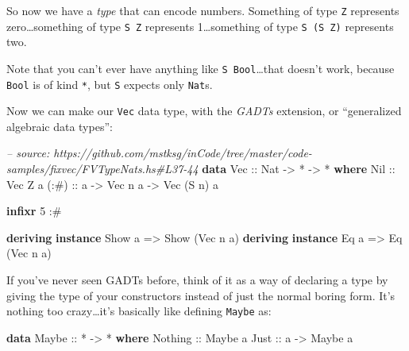 \documentclass[]{article}
\newenvironment{Shaded}{}{}
\newcommand{\KeywordTok}[1]{\textcolor[rgb]{0.00,0.44,0.13}{\textbf{{#1}}}}
\newcommand{\DataTypeTok}[1]{\textcolor[rgb]{0.56,0.13,0.00}{{#1}}}
\newcommand{\DecValTok}[1]{\textcolor[rgb]{0.25,0.63,0.44}{{#1}}}
\newcommand{\CommentTok}[1]{\textcolor[rgb]{0.38,0.63,0.69}{\textit{{#1}}}}
\newcommand{\OtherTok}[1]{\textcolor[rgb]{0.00,0.44,0.13}{{#1}}}
\newcommand{\FunctionTok}[1]{\textcolor[rgb]{0.02,0.16,0.49}{{#1}}}
\newcommand{\NormalTok}[1]{{#1}}
\begin{document}
So now we have a \emph{type} that can encode numbers. Something of type
\texttt{Z} represents zero\ldots{}something of type \texttt{S\ Z}
represents 1\ldots{}something of type \texttt{S\ (S\ Z)} represents two.

Note that you can't ever have anything like \texttt{S\ Bool}\ldots{}that
doesn't work, because \texttt{Bool} is of kind \texttt{*}, but
\texttt{S} expects only \texttt{Nat}s.

Now we can make our \texttt{Vec} data type, with the \emph{GADTs}
extension, or ``generalized algebraic data types'':

\begin{Shaded}
\begin{Highlighting}[]
\CommentTok{-- source: https://github.com/mstksg/inCode/tree/master/code-samples/fixvec/FVTypeNats.hs#L37-44}
\KeywordTok{data} \DataTypeTok{Vec}\OtherTok{ ::} \DataTypeTok{Nat} \OtherTok{->} \FunctionTok{*} \OtherTok{->} \FunctionTok{*} \KeywordTok{where}
    \DataTypeTok{Nil}\OtherTok{  ::} \DataTypeTok{Vec} \DataTypeTok{Z} \NormalTok{a}
\OtherTok{    (:#) ::} \NormalTok{a }\OtherTok{->} \DataTypeTok{Vec} \NormalTok{n a }\OtherTok{->} \DataTypeTok{Vec} \NormalTok{(}\DataTypeTok{S} \NormalTok{n) a}

\KeywordTok{infixr} \DecValTok{5} \FunctionTok{:#}

\KeywordTok{deriving} \KeywordTok{instance} \DataTypeTok{Show} \NormalTok{a }\OtherTok{=>} \DataTypeTok{Show} \NormalTok{(}\DataTypeTok{Vec} \NormalTok{n a)}
\KeywordTok{deriving} \KeywordTok{instance} \DataTypeTok{Eq} \NormalTok{a }\OtherTok{=>} \DataTypeTok{Eq} \NormalTok{(}\DataTypeTok{Vec} \NormalTok{n a)}
\end{Highlighting}
\end{Shaded}

If you've never seen GADTs before, think of it as a way of declaring a
type by giving the type of your constructors instead of just the normal
boring form. It's nothing too crazy\ldots{}it's basically like defining
\texttt{Maybe} as:

\begin{Shaded}
\begin{Highlighting}[]
\KeywordTok{data} \DataTypeTok{Maybe}\OtherTok{ ::} \FunctionTok{*} \OtherTok{->} \FunctionTok{*} \KeywordTok{where}
    \DataTypeTok{Nothing}\OtherTok{ ::} \DataTypeTok{Maybe} \NormalTok{a}
    \DataTypeTok{Just}\OtherTok{    ::} \NormalTok{a }\OtherTok{->} \DataTypeTok{Maybe} \NormalTok{a}
\end{Highlighting}
\end{Shaded}
\end{document}
